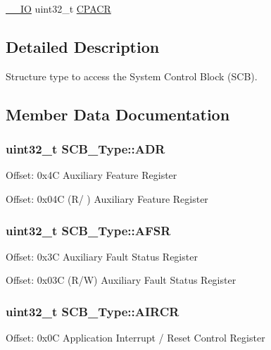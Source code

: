 \begin{DoxyCompactItemize}
\item 
\hyperlink{group___c_m_s_i_s__core__definitions_gaec43007d9998a0a0e01faede4133d6be}{\-\_\-\-\_\-\-I\-O} uint32\-\_\-t \hyperlink{struct_s_c_b___type_af460b56ce524a8e3534173f0aee78e85}{C\-P\-A\-C\-R}
\end{DoxyCompactItemize}


\subsection{Detailed Description}
Structure type to access the System Control Block (S\-C\-B). 

\subsection{Member Data Documentation}
\hypertarget{struct_s_c_b___type_aaedf846e435ed05c68784b40d3db2bf2}{
\subsubsection[{A\-D\-R}]{ uint32\-\_\-t S\-C\-B\-\_\-\-Type\-::\-A\-D\-R}}\label{struct_s_c_b___type_aaedf846e435ed05c68784b40d3db2bf2}
Offset\-: 0x4\-C Auxiliary Feature Register

Offset\-: 0x04\-C (R/ ) Auxiliary Feature Register \hypertarget{struct_s_c_b___type_aeb77053c84f49c261ab5b8374e8958ef}{
\subsubsection[{A\-F\-S\-R}]{ uint32\-\_\-t S\-C\-B\-\_\-\-Type\-::\-A\-F\-S\-R}}\label{struct_s_c_b___type_aeb77053c84f49c261ab5b8374e8958ef}
Offset\-: 0x3\-C Auxiliary Fault Status Register

Offset\-: 0x03\-C (R/\-W) Auxiliary Fault Status Register \hypertarget{struct_s_c_b___type_a6ed3c9064013343ea9fd0a73a734f29d}{
\subsubsection[{A\-I\-R\-C\-R}]{ uint32\-\_\-t S\-C\-B\-\_\-\-Type\-::\-A\-I\-R\-C\-R}}\label{struct_s_c_b___type_a6ed3c9064013343ea9fd0a73a734f29d}
Offset\-: 0x0\-C Application Interrupt / Reset Control Register

